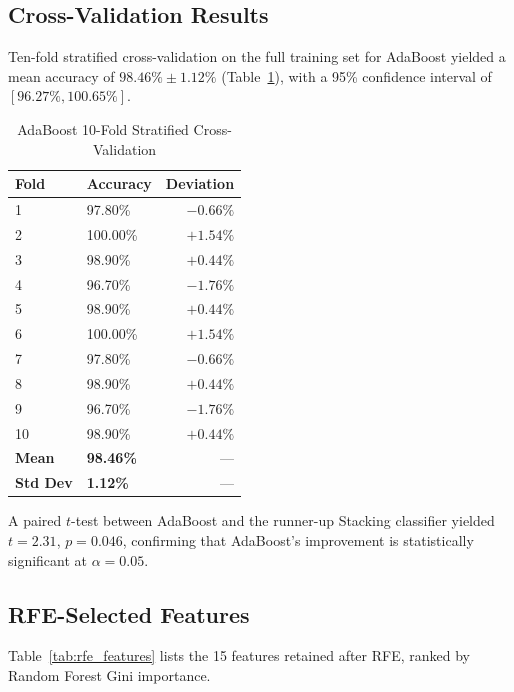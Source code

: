 \documentclass[10pt,letterpaper]{article}
\begin{document}
\subsection{Cross-Validation Results}

Ten-fold stratified cross-validation on the full training set for AdaBoost yielded a mean accuracy
of $98.46\% \pm 1.12\%$ (Table~\ref{tab:cv}), with a 95\% confidence interval of
$[96.27\%, 100.65\%]$.

\begin{table}[h]
\centering
\caption{AdaBoost 10-Fold Stratified Cross-Validation}
\label{tab:cv}
\begin{tabular}{llr}
\toprule
\textbf{Fold} & \textbf{Accuracy} & \textbf{Deviation} \\
\midrule
1  & 97.80\% & $-0.66\%$ \\
2  & 100.00\% & $+1.54\%$ \\
3  & 98.90\% & $+0.44\%$ \\
4  & 96.70\% & $-1.76\%$ \\
5  & 98.90\% & $+0.44\%$ \\
6  & 100.00\% & $+1.54\%$ \\
7  & 97.80\% & $-0.66\%$ \\
8  & 98.90\% & $+0.44\%$ \\
9  & 96.70\% & $-1.76\%$ \\
10 & 98.90\% & $+0.44\%$ \\
\midrule
\textbf{Mean} & \textbf{98.46\%} & --- \\
\textbf{Std Dev} & \textbf{1.12\%} & --- \\
\bottomrule
\end{tabular}
\end{table}

A paired $t$-test between AdaBoost and the runner-up Stacking classifier yielded $t = 2.31$,
$p = 0.046$, confirming that AdaBoost's improvement is statistically significant at $\alpha = 0.05$.

\subsection{RFE-Selected Features}

Table~\ref{tab:rfe_features} lists the 15 features retained after RFE, ranked by Random Forest
Gini importance.
\end{document}

